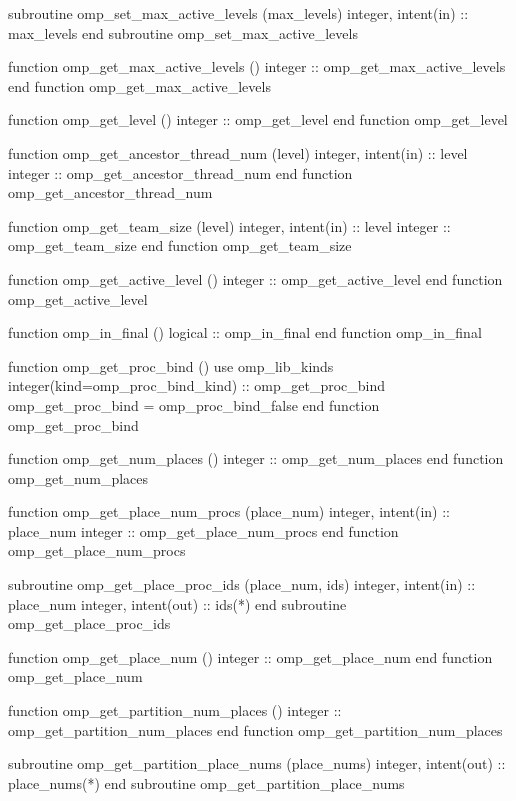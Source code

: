 {\begin{ompfFunction}
          subroutine omp_set_max_active_levels (max_levels)
           integer, intent(in) :: max_levels
          end subroutine omp_set_max_active_levels

          function omp_get_max_active_levels ()
           integer :: omp_get_max_active_levels
          end function omp_get_max_active_levels

          function omp_get_level ()
           integer :: omp_get_level
          end function omp_get_level

          function omp_get_ancestor_thread_num (level)
           integer, intent(in) :: level
           integer :: omp_get_ancestor_thread_num
          end function omp_get_ancestor_thread_num

          function omp_get_team_size (level)
           integer, intent(in) :: level
           integer :: omp_get_team_size
          end function omp_get_team_size

          function omp_get_active_level ()
           integer :: omp_get_active_level
          end function omp_get_active_level

          function omp_in_final ()
           logical :: omp_in_final
          end function omp_in_final

          function omp_get_proc_bind ()
           use omp_lib_kinds
           integer(kind=omp_proc_bind_kind) :: omp_get_proc_bind
           omp_get_proc_bind = omp_proc_bind_false
          end function omp_get_proc_bind

          function omp_get_num_places ()
           integer :: omp_get_num_places
          end function omp_get_num_places

          function omp_get_place_num_procs (place_num)
           integer, intent(in) :: place_num
           integer :: omp_get_place_num_procs
          end function omp_get_place_num_procs

          subroutine omp_get_place_proc_ids (place_num, ids)
           integer, intent(in) :: place_num
           integer, intent(out) :: ids(*)
          end subroutine omp_get_place_proc_ids

          function omp_get_place_num ()
           integer :: omp_get_place_num
          end function omp_get_place_num

          function omp_get_partition_num_places ()
           integer :: omp_get_partition_num_places
          end function omp_get_partition_num_places

          subroutine omp_get_partition_place_nums (place_nums)
           integer, intent(out) :: place_nums(*)
          end subroutine omp_get_partition_place_nums


\end{ompfFunction}}
